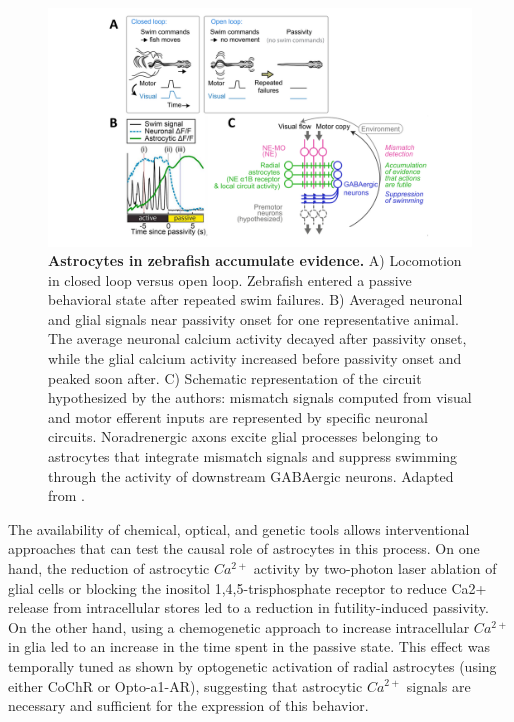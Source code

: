 \begin{figure}
    \centering
    \includegraphics[trim={140 0 100 0},clip,width=\textwidth]{Figures/Chapter1/intro_fig_astro_evidence.pdf}
    \caption[Astrocytes in zebrafish accumulate evidence]{\textbf{Astrocytes in zebrafish accumulate evidence.} 
    A) Locomotion in closed loop versus open loop. 
    Zebrafish entered a passive behavioral state after repeated swim failures. 
    B) Averaged neuronal and glial signals near passivity onset for one representative animal.
    The average neuronal calcium activity decayed after passivity onset, while the glial calcium activity increased before passivity onset and peaked soon after. 
    C) Schematic representation of the circuit hypothesized by the authors: mismatch signals computed from visual and motor efferent inputs are represented by specific neuronal circuits. 
    Noradrenergic axons excite glial processes belonging to astrocytes that integrate mismatch signals and suppress swimming through the activity of downstream GABAergic neurons. 
    Adapted from \cite{mu2019}.}
    \label{fig:chap1:astro_evidence}
\end{figure}
The availability of chemical, optical, and genetic tools allows interventional approaches that can test the causal role of astrocytes in this process. 
On one hand, the reduction of astrocytic $Ca^{2+}$ activity by two-photon laser ablation of glial cells or blocking the inositol 1,4,5-trisphosphate receptor to reduce Ca2+ release from intracellular stores led to a reduction in  futility-induced passivity. 
On the other hand, using a chemogenetic approach to increase intracellular $Ca^{2+}$ in glia led to an increase in the time spent in the passive state. 
This effect was temporally tuned as shown by optogenetic activation of radial astrocytes (using either CoChR or Opto-a1-AR), suggesting that astrocytic $Ca^{2+}$ signals are necessary and sufficient for the expression of this behavior. 

